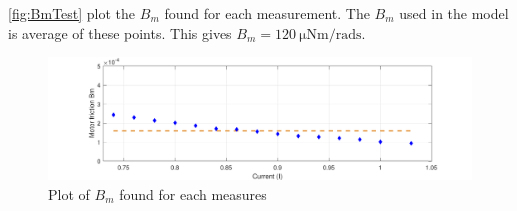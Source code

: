\autoref{fig:BmTest} plot the $B_m$ found for each measurement. The $B_m$ used in the model is average of these points. This gives $B_m=\SI{120}{\micro\newton\meter\per\radian\second}$.

\begin{figure}[htbp]
	\centering
	\includegraphics[width=\textwidth]{figures/appendix/Motor&GearTests/PlotBm}
	\caption{Plot of $B_m$ found for each measures}\label{fig:BmTest}
\end{figure}
\break